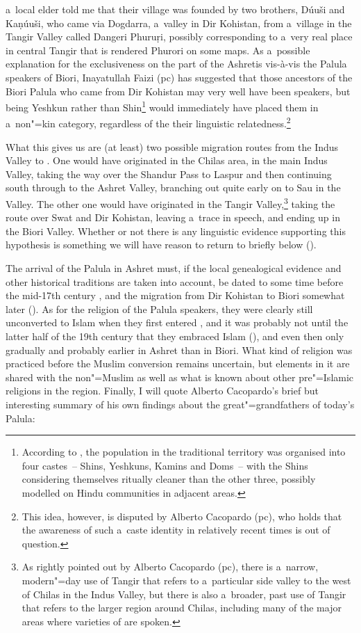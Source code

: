 a~local elder told me that their village was founded by two brothers, Dúuši‌ and ‌Kaṇúuši, who came
via Dogdarra, a~valley in Dir Kohistan, from a~village in the Tangir Valley called Dangeri Phuruṛi,
possibly corresponding to a~very real place in central Tangir that is rendered Phurori on some
maps. As a~possible explanation for the exclusiveness on the part of the Ashretis vis-à-vis the
Palula speakers of Biori, Inayatullah Faizi (pc) has suggested that those ancestors of the Biori
Palula who came from Dir Kohistan may very well have been \iliShina speakers, but being Yeshkun rather
than Shin\footnote{According to \citet[17]{jettmar2002}, the population in the traditional \iliShina
  territory was organised into four castes~-- Shins, Yeshkuns, Kamins and Doms~-- with the Shins
  considering themselves ritually cleaner than the other three, possibly modelled on Hindu
  communities in adjacent areas. } would immediately have placed them in a~non"=kin category,
regardless of the their linguistic relatedness.\footnote{This idea, however, is disputed by Alberto
  Cacopardo (pc), who holds that the awareness of such a~caste identity in relatively recent times
  is out of question.}


What this gives us are (at least) two possible migration routes from the Indus Valley to
\iliChitral. One would have originated in the Chilas area, in the main Indus Valley, taking the way over
the Shandur Pass to Laspur and then continuing south through \iliChitral to the Ashret Valley, branching
out quite early on to Sau in the \iliKunar Valley. The other one would have originated in the Tangir
Valley,\footnote{As rightly pointed out by Alberto Cacopardo (pc), there is a~narrow, modern"=day use
  of Tangir that refers to a~particular side valley to the west of Chilas in the Indus Valley, but
  there is also a~broader, past use of Tangir that refers to the larger region around Chilas,
  including many of the major areas where varieties of \iliShina are spoken.} taking the route over
Swat and Dir Kohistan, leaving a~trace in \iliKalkoti speech, and ending up in the Biori Valley. Whether or
not there is any linguistic evidence supporting this hypothesis is something we will have reason to
return to briefly below ().


The arrival of the Palula in Ashret must, if the local genealogical evidence and other historical
traditions are taken into account, be dated to some time before the mid-17th century \citep[88]{cacopardo2001}, and the migration from Dir Kohistan to Biori somewhat later
(\citeyear[118]{cacopardo2001}). As for the religion of the Palula speakers, they were clearly still
unconverted to Islam when they first entered \iliChitral, and it was probably not until the latter half
of the 19th century that they embraced Islam (\citeyear[83]{cacopardo2001}), and
even then only gradually and probably earlier in Ashret than in Biori. What kind of religion was
practiced before the Muslim conversion remains uncertain, but elements in it are shared with the
non"=Muslim \iliKalasha as well as what is known about other pre"=Islamic religions in the region. Finally, I will quote Alberto Cacopardo's brief but interesting summary of his own findings about the great"=grandfathers of today's Palula:

